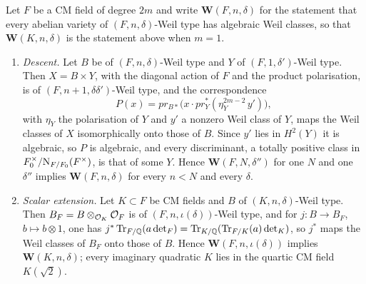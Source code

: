 \begin{proposition}\label{prop:descent}
Let $F$ be a CM field of degree $2m$ and write $\mathbf{W}(F,n,\delta)$ for
the statement that every abelian variety of $(F,n,\delta)$-Weil type has
algebraic Weil classes, so that $\mathbf{W}(K,n,\delta)$ is the statement
above when $m=1$.
\begin{enumerate}[label=\textup{(\roman*)},leftmargin=2.6em]
\item \emph{Descent.} Let $B$ be of $(F,n,\delta)$-Weil type and $Y$ of
  $(F,1,\delta')$-Weil type. Then $X=B\times Y$, with the diagonal action of
  $F$ and the product polarisation, is of $(F,n+1,\delta\delta')$-Weil type,
  and the correspondence
  \[
    P(x)=pr_{B*}\bigl(x\cdot pr_{Y}^{*}(\eta_{Y}^{2m-2}\,y')\bigr),
  \]
  with $\eta_{Y}$ the polarisation of $Y$ and $y'$ a nonzero Weil class of
  $Y$, maps the Weil classes of $X$ isomorphically onto those of $B$. Since
  $y'$ lies in $H^{2}(Y)$ it is algebraic, so $P$ is algebraic, and every
  discriminant, a totally positive class in
  $F_{0}^{\times}/\mathrm{N}_{F/F_{0}}(F^{\times})$, is that of some $Y$.
  Hence $\mathbf{W}(F,N,\delta'')$ for one $N$ and one $\delta''$ implies
  $\mathbf{W}(F,n,\delta)$ for every $n<N$ and every $\delta$.
\item \emph{Scalar extension.} Let $K\subset F$ be CM fields and $B$ of
  $(K,n,\delta)$-Weil type. Then $B_{F}=B\otimes_{\mathcal{O}_{K}}\mathcal{O}_{F}$ is of
  $(F,n,\iota(\delta))$-Weil type, and for $j\colon B\to B_{F}$,
  $b\mapsto b\otimes1$, one has
  $j^{*}\operatorname{Tr}_{F/\mathbb{Q}}(a\det_{F})=\operatorname{Tr}_{K/\mathbb{Q}}(\operatorname{Tr}_{F/K}(a)\det_{K})$, so $j^{*}$
  maps the Weil classes of $B_{F}$ onto those of $B$. Hence
  $\mathbf{W}(F,n,\iota(\delta))$ implies $\mathbf{W}(K,n,\delta)$; every
  imaginary quadratic $K$ lies in the quartic CM field $K(\sqrt2)$.
\end{enumerate}
\end{proposition}

